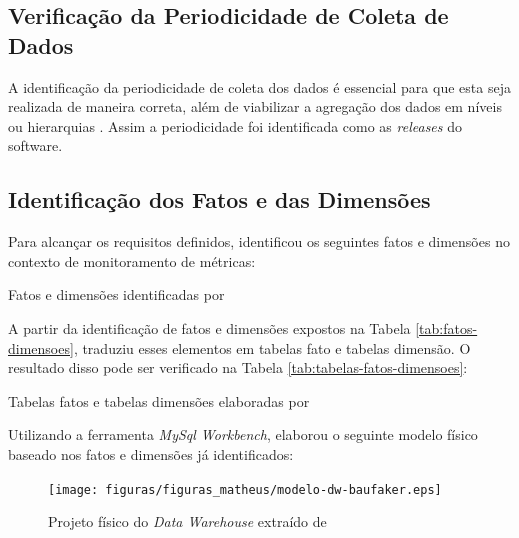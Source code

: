 \subsection{Verificação da Periodicidade de Coleta de Dados}

A identificação da periodicidade de coleta dos dados é essencial para que esta seja
realizada de maneira correta, além de viabilizar a agregação dos dados em níveis ou
hierarquias \cite{rego_monitoramento_2014}. Assim a periodicidade foi identificada como as \textit{releases} do software.

\subsection{Identificação dos Fatos e das Dimensões}
	
Para alcançar os requisitos definidos,  identificou os seguintes fatos e dimensões no contexto de monitoramento de métricas:

\begin{table}[!ht]
	\begin{center}
	
	 
	\caption{Fatos e dimensões identificadas por }
	\label{tab:fatos-dimensoes}
	\end{center}
	\end{table}	
	\FloatBarrier


A partir da identificação de fatos e dimensões expostos na Tabela \ref{tab:fatos-dimensoes},   traduziu esses elementos em tabelas fato e tabelas dimensão. O resultado disso pode ser verificado na Tabela \ref{tab:tabelas-fatos-dimensoes}:

\begin{table}[!ht]
	\begin{center}
	
	 
	\caption{Tabelas fatos e tabelas dimensões elaboradas por }
	\label{tab:tabelas-fatos-dimensoes}
	\end{center}
	\end{table}	
	\FloatBarrier


Utilizando a ferramenta \textit{MySql Workbench},  elaborou o seguinte modelo físico baseado nos fatos e dimensões já identificados:

\begin{figure}[h!]
\centering
\texttt{[image: figuras/figuras\_matheus/modelo-dw-baufaker.eps]}
\caption{Projeto físico do \textit{Data Warehouse} extraído de }
\label{fig:arquitetura_solucao_baufaker}
\end{figure}
\FloatBarrier

